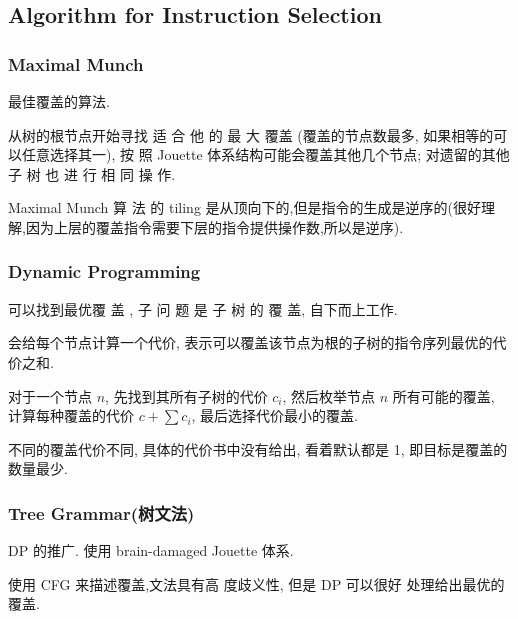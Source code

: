 \subsection{Algorithm for Instruction Selection}
\subsubsection{Maximal Munch}
最佳覆盖的算法.

从树的根节点开始寻找 适 合 他 的 最 大 覆盖 (覆盖的节点数最多, 如果相等的可以任意选择其一), 按 照 Jouette 体系结构可能会覆盖其他几个节点; 对遗留的其他 子 树 也 进 行 相 同 操 作.

Maximal Munch 算 法 的 tiling 是从顶向下的,但是指令的生成是逆序的(很好理解,因为上层的覆盖指令需要下层的指令提供操作数,所以是逆序).


\subsubsection{Dynamic Programming}
可以找到最优覆 盖 , 子 问 题 是 子 树 的 覆 盖, 自下而上工作.

会给每个节点计算一个代价, 表示可以覆盖该节点为根的子树的指令序列最优的代价之和. 

对于一个节点 $n$, 先找到其所有子树的代价 $c_i$, 然后枚举节点 $n$ 所有可能的覆盖, 计算每种覆盖的代价 $c+\sum c_i$, 最后选择代价最小的覆盖.

不同的覆盖代价不同, 具体的代价书中没有给出, 看着默认都是 1, 即目标是覆盖的数量最少.

\subsubsection{Tree Grammar(树文法)}
DP 的推广. 使用 brain-damaged Jouette 体系.

使用 CFG 来描述覆盖,文法具有高 度歧义性, 但是 DP 可以很好 处理给出最优的覆盖.

